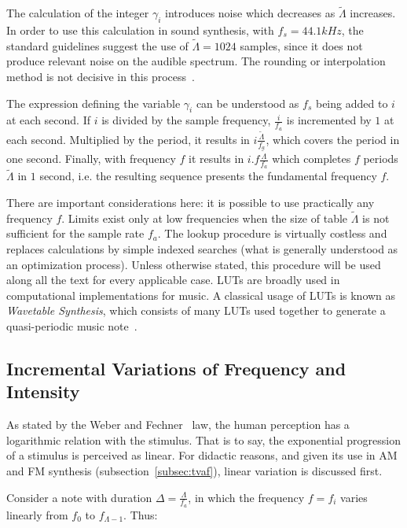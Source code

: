 The calculation of the integer $\gamma_i$ introduces noise which decreases as $\widetilde{\Lambda}$ increases.
In order to use this calculation in sound synthesis, with $f_s=44.1 kHz$, the standard guidelines suggest the use of $\widetilde{\Lambda} = 1024$ samples, since it does not produce relevant noise on the audible spectrum. The rounding or interpolation method is not decisive in this process~\cite{Geiger}.

The expression defining the variable $\gamma_i$ can be understood as $f_s$ being added to $i$ at each second.
If $i$ is divided by the sample frequency, $\frac{i}{f_a}$
is incremented by $1$ at each second. Multiplied by the period, it results in $i \frac{\widetilde{\Lambda}}{f_a}$, which covers the period in one second. Finally, with frequency $f$ it results in $i . f \frac{\widetilde{\Lambda}}{f_a}$ which completes $f$ periods $\widetilde{\Lambda}$ in $1$ second, i.e. the resulting sequence presents the fundamental frequency $f$.

There are important considerations here: it is possible to use practically any frequency $f$. Limits exist only at low frequencies when the size of table $\widetilde{\Lambda}$ is not sufficient for the sample rate $f_a$. The lookup procedure is virtually costless and replaces calculations by simple indexed searches (what is generally understood as an optimization process). Unless otherwise stated, this procedure will be used along all the text for every applicable case.
LUTs are broadly used in computational implementations for music. A classical usage of LUTs is known as \emph{Wavetable Synthesis}, which consists of many LUTs used together to generate a quasi-periodic music note~\cite{Cook,Wavetable}.

\subsection{Incremental Variations of Frequency and Intensity}\label{subsec:vars}
As stated by the Weber and Fechner~\cite{Weber-Fechner} law, the human perception has a logarithmic relation with the stimulus. That is to say, the exponential progression of a stimulus is perceived as linear.
For didactic reasons, and given its use in AM and FM synthesis (subsection~\ref{subsec:tvaf}), linear variation is discussed first.

Consider a note with duration $\Delta = \frac{\Lambda}{f_a}$, in which the frequency $f=f_i$ varies linearly from $f_0$ to $f_{\Lambda -1}$. Thus:

